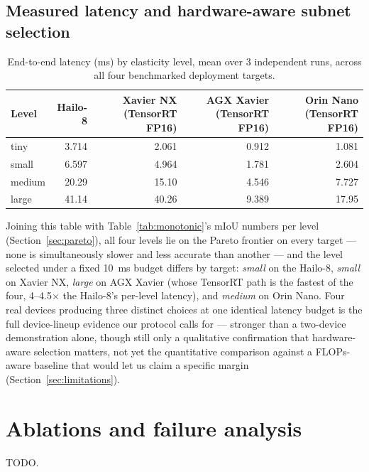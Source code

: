 \documentclass[a4paper,review,12pt]{elsarticle}
\begin{document}
\subsection{Measured latency and hardware-aware subnet selection}
\label{sec:latency-results}

\begin{table}[h]
\centering
\caption{End-to-end latency (ms) by elasticity level, mean over 3 independent runs, across all four benchmarked deployment targets.}
\label{tab:latency}
\begin{tabular}{lrrrr}
\toprule
Level & Hailo-8 & Xavier NX (TensorRT FP16) & AGX Xavier (TensorRT FP16) & Orin Nano (TensorRT FP16) \\
\midrule
tiny   & 3.714 & 2.061 & 0.912 & 1.081 \\
small  & 6.597 & 4.964 & 1.781 & 2.604 \\
medium & 20.29 & 15.10 & 4.546 & 7.727 \\
large  & 41.14 & 40.26 & 9.389 & 17.95 \\
\bottomrule
\end{tabular}
\end{table}

Joining this table with Table~\ref{tab:monotonic}'s mIoU numbers per level
(Section~\ref{sec:pareto}), all four levels lie on the Pareto frontier on
every target --- none is simultaneously slower and less accurate than
another --- and the level selected under a fixed 10~ms budget differs by
target: \emph{small} on the Hailo-8, \emph{small} on Xavier NX, \emph{large}
on AGX Xavier (whose TensorRT path is the fastest of the four, 4--4.5$\times$
the Hailo-8's per-level latency), and \emph{medium} on Orin Nano. Four real
devices producing three distinct choices at one identical latency budget is
the full device-lineup evidence our protocol calls for --- stronger than a
two-device demonstration alone, though still only a qualitative confirmation
that hardware-aware selection matters, not yet the quantitative comparison
against a FLOPs-aware baseline that would let us claim a specific margin
(Section~\ref{sec:limitations}).

\section{Ablations and failure analysis}
\label{sec:ablations}
TODO.
\end{document}
